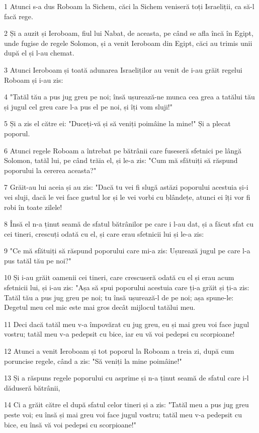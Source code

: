 \par 1 Atunci s-a dus Roboam la Sichem, căci la Sichem veniseră toți Israeliții, ca să-l facă rege.
\par 2 Și a auzit și Ieroboam, fiul lui Nabat, de aceasta, pe când se afla încă în Egipt, unde fugise de regele Solomon, și a venit Ieroboam din Egipt, căci au trimis unii după el și l-au chemat.
\par 3 Atunci Ieroboam și toată adunarea Israeliților au venit de i-au grăit regelui Roboam și i-au zis:
\par 4 "Tatăl tău a pus jug greu pe noi; însă ușurează-ne munca cea grea a tatălui tău și jugul cel greu care l-a pus el pe noi, și îți vom sluji!"
\par 5 Și a zis el către ei: "Duceți-vă și să veniți poimâine la mine!" Și a plecat poporul.
\par 6 Atunci regele Roboam a întrebat pe bătrânii care fuseseră sfetnici pe lângă Solomon, tatăl lui, pe când trăia el, și le-a zis: "Cum mă sfătuiți să răspund poporului la cererea aceasta?"
\par 7 Grăit-au lui aceia și au zis: "Dacă tu vei fi slugă astăzi poporului acestuia și-i vei sluji, dacă le vei face gustul lor și le vei vorbi cu blândețe, atunci ei îți vor fi robi în toate zilele!
\par 8 Însă el n-a ținut seamă de sfatul bătrânilor pe care i l-au dat, și a făcut sfat cu cei tineri, crescuți odată cu el, și care erau sfetnicii lui și le-a zis:
\par 9 "Ce mă sfătuiți să răspund poporului care mi-a zis: Ușurează jugul pe care l-a pus tatăl tău pe noi?"
\par 10 Și i-au grăit oamenii cei tineri, care crescuseră odată cu el și erau acum sfetnicii lui, și i-au zis: "Așa să spui poporului acestuia care ți-a grăit și ți-a zis: Tatăl tău a pus jug greu pe noi; tu însă ușurează-l de pe noi; așa spune-le: Degetul meu cel mic este mai gros decât mijlocul tatălui meu.
\par 11 Deci dacă tatăl meu v-a împovărat cu jug greu, eu și mai greu voi face jugul vostru; tatăl meu v-a pedepsit cu bice, iar eu vă voi pedepsi cu scorpioane!
\par 12 Atunci a venit Ieroboam și tot poporul la Roboam a treia zi, după cum poruncise regele, când a zis: "Să veniți la mine poimâine!"
\par 13 Și a răspuns regele poporului cu asprime și n-a ținut seamă de sfatul care i-l dăduseră bătrânii,
\par 14 Ci a grăit către el după sfatul celor tineri și a zis: "Tatăl meu a pus jug greu peste voi; eu însă și mai greu voi face jugul vostru; tatăl meu v-a pedepsit cu bice, eu însă vă voi pedepsi cu scorpioane!"
